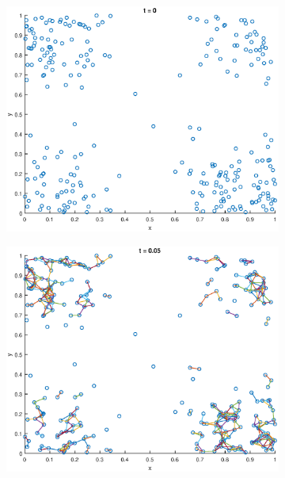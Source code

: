 \documentclass[10pt]{article}
\begin{document}
\begin{figure}
  \centering
  \caption{Minkowski clustering for different threshold values.}
	\begin{subfigure}[b]{.49\textwidth}
		\includegraphics[width=\columnwidth]{Ass1_0.eps}
		\caption{}
		\label{fig1a}
	\end{subfigure}  
	\begin{subfigure}[b]{.49\textwidth}
		\includegraphics[width=\columnwidth]{Ass1_5.eps}
		\caption{}
		\label{fig1b}
	\end{subfigure}
	\quad

\end{figure}
\end{document}
